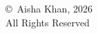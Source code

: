 \thispagestyle{empty}
\vspace*{\fill}
\begin{center}
\copyright\ Aisha Khan, 2026\\
All Rights Reserved
\end{center}
\vspace*{\fill}
\clearpage
